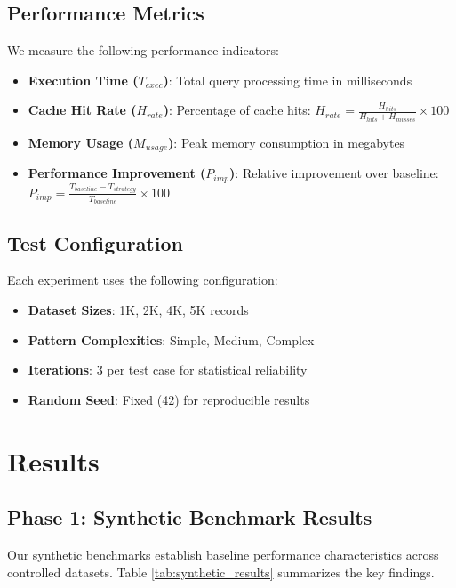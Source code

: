 \documentclass[conference]{IEEEtran}
\begin{document}
\subsection{Performance Metrics}

We measure the following performance indicators:

\begin{itemize}
\item \textbf{Execution Time ($T_{exec}$)}: Total query processing time in milliseconds
\item \textbf{Cache Hit Rate ($H_{rate}$)}: Percentage of cache hits: $H_{rate} = \frac{H_{hits}}{H_{hits} + H_{misses}} \times 100$
\item \textbf{Memory Usage ($M_{usage}$)}: Peak memory consumption in megabytes
\item \textbf{Performance Improvement ($P_{imp}$)}: Relative improvement over baseline: $P_{imp} = \frac{T_{baseline} - T_{strategy}}{T_{baseline}} \times 100$
\end{itemize}

\subsection{Test Configuration}

Each experiment uses the following configuration:
\begin{itemize}
\item \textbf{Dataset Sizes}: 1K, 2K, 4K, 5K records
\item \textbf{Pattern Complexities}: Simple, Medium, Complex
\item \textbf{Iterations}: 3 per test case for statistical reliability
\item \textbf{Random Seed}: Fixed (42) for reproducible results
\end{itemize}

\section{Results}

\subsection{Phase 1: Synthetic Benchmark Results}

Our synthetic benchmarks establish baseline performance characteristics across controlled datasets. Table \ref{tab:synthetic_results} summarizes the key findings.
\end{document}
